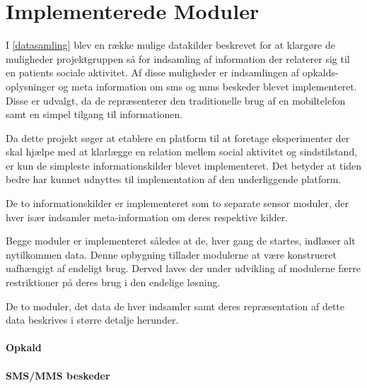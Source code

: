 \section{Implementerede Moduler}
I \cref{datasamling} blev en række mulige datakilder beskrevet for at klargøre de muligheder projektgruppen så for indsamling af information der relaterer sig til en patients sociale aktivitet.
Af disse muligheder er indsamlingen af opkalds-oplysninger og meta information om sms og mms beskeder blevet implementeret.
Disse er udvalgt, da de repræsenterer den traditionelle brug af en mobiltelefon samt en simpel tilgang til informationen.

Da dette projekt søger at etablere en platform til at foretage eksperimenter der skal hjælpe med at klarlægge en relation mellem social aktivitet og sindstilstand, er kun de simpleste informationskilder blevet implementeret.
Det betyder at tiden bedre har kunnet udnyttes til implementation af den underliggende platform.

De to informationskilder er implementeret som to separate sensor moduler, der hver især indsamler meta-information om deres respektive kilder.

Begge moduler er implementeret således at de, hver gang de startes, indlæser alt nytilkommen data.
Denne opbygning tillader modulerne at være konstrueret uafhængigt af endeligt brug.
Derved laves der under udvikling af modulerne færre restriktioner på deres brug i den endelige løsning.

De to moduler, det data de hver indsamler samt deres repræsentation af dette data beskrives i større detalje herunder.


\paragraph{Opkald}


\paragraph{SMS/MMS beskeder}
